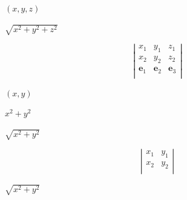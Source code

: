 \documentclass{article}
\begin{document}
$(x,y,z)$
\pagebreak

$\sqrt{x^2+y^2+z^2}$
\pagebreak

\[\left|
 \begin{array}{ccc}
 x_1& y_1 & z_1\\
 x_2 &y_2 & z_2\\
 \mathbf{e}_1 & \mathbf{e}_2 & \mathbf{e}_3\\
 \end{array}
\right|
\]
\pagebreak

$(x,y)$
\pagebreak

$x^2+y^2$
\pagebreak

$ \sqrt{x^2+y^2}$
\pagebreak

\[\left|
\begin{array}{cc}
x_1 & y_1\\
x_2 & y_2 \\
\end{array}
\right|
\]
\pagebreak

$\sqrt{x^2+y^2}$
\pagebreak
\end{document}

